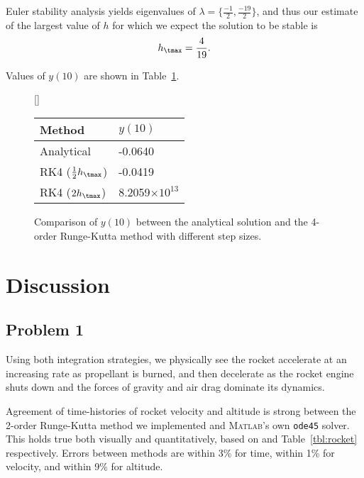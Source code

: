 \documentclass[12pt]{article}
\begin{document}
Euler stability analysis yields eigenvalues of $\lambda = \{ \tfrac{-1}{2}, \tfrac{-19}{2} \}$, and thus our estimate of the largest value of $h$ for which we expect the solution to be stable is
\begin{equation}
h_\tmax = \frac{4}{19}
.
\end{equation}

Values of $y(10)$ are shown in Table~\ref{tbl:prob3}.

\begin{figure}[h!]
[\FBwidth]
{\caption{Comparison of $y(10)$ between the analytical solution and the 4\th-order Runge-Kutta method with different step sizes.}\label{tbl:prob3}}
{
	\begin{tabular}{ll}
	\toprule
	Method & $y(10)$ \\
	\midrule
	Analytical                  & -0.0640 \\
	RK4 ($\tfrac{1}{2}h_\tmax$) & -0.0419 \\
	RK4 ($2h_\tmax$)            & 8.2059$\times10^{13}$ \\
	\bottomrule
	\end{tabular}
}
\end{figure}

\section{Discussion} %

\subsection*{Problem 1}

Using both integration strategies, we physically see the rocket accelerate at an increasing rate as propellant is burned, and then decelerate as the rocket engine shuts down and the forces of gravity and air drag dominate its dynamics. 

Agreement of time-histories of rocket velocity and altitude is strong between the 2\nd-order Runge-Kutta method we implemented and \textsc{Matlab}'s own \lstinline|ode45| solver. This holds true both visually and quantitatively, based on  and Table~\ref{tbl:rocket} respectively. Errors between methods are within 3\% for time, within 1\% for velocity, and within 9\% for altitude.
\end{document}
